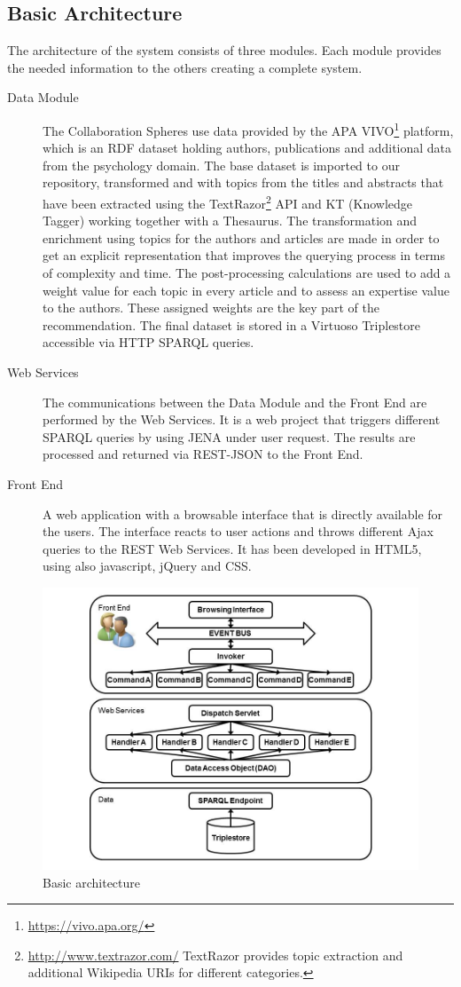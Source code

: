 \subsection{Basic Architecture}
The architecture of the system consists of three modules. Each module provides
the needed information to the others creating a complete system.
\begin{description}
\item[Data Module]The Collaboration Spheres use data provided by the APA VIVO\footnote{\url{https://vivo.apa.org/}} platform, which is an RDF dataset holding authors, publications and additional data from the psychology domain. The base dataset is imported to our repository, transformed and with topics from the titles and abstracts that have been extracted using the TextRazor\footnote{\url{http://www.textrazor.com/} TextRazor provides topic extraction and additional Wikipedia URIs for different categories.} API and KT (Knowledge Tagger) working together with a Thesaurus. The transformation and enrichment using topics for the authors and articles are made in order to get an explicit representation that improves the querying process in terms of complexity and time. The post-processing calculations are used to add a weight value for each topic in every article and to assess an expertise value to the authors. These assigned weights are the key part of the recommendation. The final dataset is stored in a Virtuoso Triplestore accessible via HTTP SPARQL queries.
\item[Web Services]The communications between the Data Module and the Front End are performed by the Web Services. It is a web project that triggers different SPARQL queries by using JENA under user request. The results are processed and returned via REST-JSON to the Front End.
\item[Front End]A web application with a browsable interface that is directly available for the users. The interface reacts to user actions and throws different Ajax queries to the REST Web Services. It has been developed in HTML5, using also javascript, jQuery and CSS. 
\end{description}
\begin{figure}[!hbt]
\centering
\includegraphics[scale=0.25]{img/APAarchitecture.jpg}
\caption{Basic architecture}
\label{fig:arch}
\end{figure}
